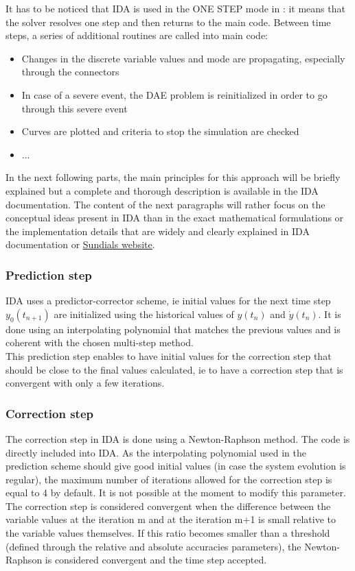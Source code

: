 \documentclass[a4paper, 12pt]{report}
\begin{document}
It has to be noticed that \ac{IDA} is used in the ONE STEP mode in \Dynawo : it means that the solver resolves one step and then returns to the main \Dynawo code. Between time steps, a series of additional routines are called into \Dynawo main code:
\begin{itemize}
\item Changes in the discrete variable values and mode are propagating, especially through the connectors
\item In case of a severe event, the \ac{DAE} problem is reinitialized in order to go through this severe event
\item Curves are plotted and criteria to stop the simulation are checked
\item ...
\end{itemize}

In the next following parts, the main principles for this approach will be briefly explained but a complete and thorough description is available in the \ac{IDA} documentation. The content of the next paragraphs will rather focus on the conceptual ideas present in \ac{IDA} than in the exact mathematical formulations or the implementation details that are widely and clearly explained in \ac{IDA} documentation or  \href{https://computation.llnl.gov/projects/sundials}{\underline{Sundials website}}.

\subsubsection{Prediction step}

\ac{IDA} uses a predictor-corrector scheme, ie initial values for the next time step $y_0(t_{n+1})$ are initialized using the historical values of $y(t_n)$ and $\dot{y}(t_n)$. It is done using an interpolating polynomial that matches the previous values and is coherent with the chosen multi-step method. \\

This prediction step enables to have initial values for the correction step that should be close to the final values calculated, ie to have a correction step that is convergent with only a few iterations.

\subsubsection{Correction step}

The correction step in IDA is done using a Newton-Raphson method. The code is directly included into IDA.
As the interpolating polynomial used in the prediction scheme should give good initial values (in case the system evolution is regular), the maximum number of iterations allowed for the correction step is equal to 4 by default. It is not possible at the moment to modify this parameter.
The correction step is considered convergent when the difference between the variable values at the iteration m and at the iteration m+1 is small relative to the variable values themselves. If this ratio becomes smaller than a threshold (defined through the relative and absolute accuracies parameters), the Newton-Raphson is considered convergent and the time step accepted.
\end{document}
